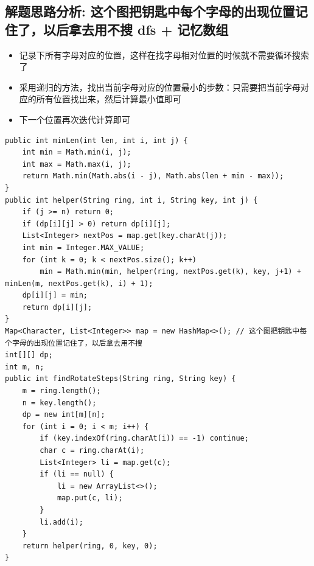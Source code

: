 \documentclass[9pt, b5paaper]{book}
\begin{document}
\subsection{解题思路分析: 这个图把钥匙中每个字母的出现位置记住了，以后拿去用不搜 dfs + 记忆数组}
\label{sec-2-14-1}
\begin{itemize}
\item 记录下所有字母对应的位置，这样在找字母相对位置的时候就不需要循环搜索了
\item 采用递归的方法，找出当前字母对应的位置最小的步数：只需要把当前字母对应的所有位置找出来，然后计算最小值即可
\item 下一个位置再次迭代计算即可
\end{itemize}
\begin{verbatim}
public int minLen(int len, int i, int j) {
    int min = Math.min(i, j);
    int max = Math.max(i, j);
    return Math.min(Math.abs(i - j), Math.abs(len + min - max));
}
public int helper(String ring, int i, String key, int j) {
    if (j >= n) return 0;
    if (dp[i][j] > 0) return dp[i][j];
    List<Integer> nextPos = map.get(key.charAt(j));
    int min = Integer.MAX_VALUE;
    for (int k = 0; k < nextPos.size(); k++) 
        min = Math.min(min, helper(ring, nextPos.get(k), key, j+1) + minLen(m, nextPos.get(k), i) + 1);
    dp[i][j] = min;
    return dp[i][j];
}
Map<Character, List<Integer>> map = new HashMap<>(); // 这个图把钥匙中每个字母的出现位置记住了，以后拿去用不搜
int[][] dp;
int m, n;
public int findRotateSteps(String ring, String key) {
    m = ring.length();
    n = key.length();
    dp = new int[m][n];
    for (int i = 0; i < m; i++) {
        if (key.indexOf(ring.charAt(i)) == -1) continue;
        char c = ring.charAt(i);
        List<Integer> li = map.get(c);
        if (li == null) {
            li = new ArrayList<>();
            map.put(c, li);
        }
        li.add(i);
    }
    return helper(ring, 0, key, 0);
}
\end{verbatim}
\end{document}
